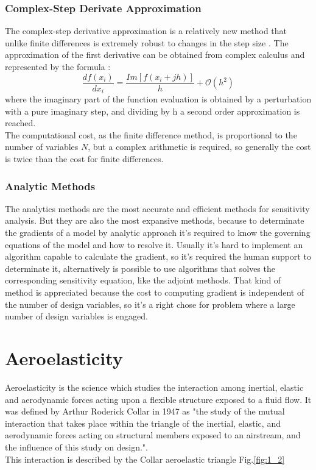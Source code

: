 \subsubsection{Complex-Step Derivate Approximation}
The complex-step derivative approximation is a relatively new method that unlike finite differences is extremely robust to changes in the step size \cite{mart2}. The approximation of the first derivative can be obtained from complex calculus and represented by the formula :
\begin{equation*}
\frac{df(x_i)}{dx_i}=\frac{Im[f(x_i+jh)]}{h}+\mathcal{O}(h^2)
\end{equation*}
where the imaginary part of the function evaluation is obtained by a perturbation with a pure imaginary step, and dividing by h a second order approximation is reached.\\
The computational cost, as the finite difference method, is proportional to the number of variables $N$, but a complex arithmetic is required, so generally the cost is twice than the cost for finite differences.
\subsubsection{Analytic Methods}
The analytics methods are the most accurate and efficient methods for sensitivity analysis. But they are also the most expansive methods, because to determinate the gradients of a model by analytic approach it's required to know the governing equations of the model and how to resolve it. Usually it's hard to implement an algorithm capable to calculate the gradient, so it's required the human support to determinate it, alternatively is possible to use algorithms that solves the corresponding sensitivity equation, like the adjoint methods. That kind of method is appreciated because the cost to computing gradient is independent of the number of design variables, so it's a right chose for problem where a large number of design variables is engaged.
\section{Aeroelasticity}

Aeroelasticity is the science which studies the interaction among inertial, elastic and aerodynamic forces acting upon a flexible structure exposed to a fluid flow. It was defined by Arthur Roderick Collar in 1947 as "the study of the mutual interaction that takes place within the triangle of the inertial, elastic, and aerodynamic forces acting on structural members exposed to an airstream, and the influence of this study on design.".\\
This interaction is described by the Collar aeroelastic triangle Fig.\ref{fig:1_2}


